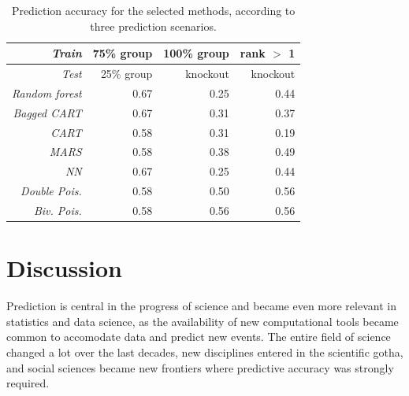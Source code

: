 \documentclass{statsoc}
\begin{document}
\begin{center}
\begin{table}
\caption{Prediction accuracy for the selected methods, according to three prediction  scenarios.}
\begin{tabular}{|r|rrr|}
\hline 
 \emph{Train}& 75\% group  & 100\% group  & rank $>$ 1   \\ 
  \hline
\emph{Test} & 25\% group & knockout & knockout\\ 
  \hline
\emph{Random forest} & 0.67 & 0.25 & 0.44 \\ 
  \emph{Bagged CART} & 0.67 & 0.31 & 0.37  \\ 
  \emph{CART} & 0.58 & 0.31 & 0.19  \\ 
  \emph{MARS} & 0.58 & 0.38 & 0.49 \\ 
  \emph{NN} & 0.67 & 0.25 & 0.44  \\ 
  \emph{Double Pois.} & 0.58 & 0.50 & 0.56  \\ 
  \emph{Biv. Pois.} & 0.58 & 0.56 & 0.56  \\ 
   \hline
\end{tabular}
\end{table}
\end{center}
%


\section{Discussion}
\label{sec:concl}

Prediction is central in the progress of science and became even more relevant in statistics and data science, as the availability of new 
computational tools became common to accomodate data and predict new events. The entire field of science changed a lot over the last 
decades, new disciplines entered in the scientific gotha, and social sciences became new frontiers where predictive accuracy was strongly required. 
\end{document}

